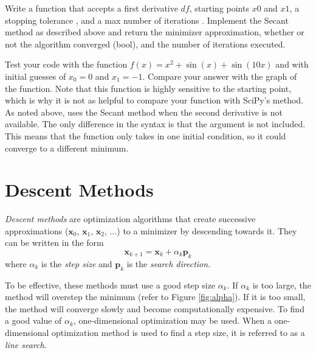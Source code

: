 \begin{problem}
Write a function that accepts a first derivative $df$, starting points $x0$ and $x1$, a stopping tolerance , and a max number of iterations .
Implement the Secant method as described above and return the minimizer approximation, whether or not the algorithm converged (bool), and the number of iterations executed.

Test your code with the function $f(x) = x^2 + \sin(x) + \sin(10x)$ and with initial guesses of $x_0 = 0$ and $x_1 = -1$.
Compare your answer with the graph of the function.
Note that this function is highly sensitive to the starting point, which is why it is not as helpful to compare your function with SciPy's method.
As noted above,  uses the Secant method when the second derivative is not available.
The only difference in the syntax is that the  argument is not included.
This means that the function only takes in one initial condition, so it could converge to a different minimum.
\end{problem}

\section*{Descent Methods} %

\emph{Descent methods} are optimization algorithms that create successive approximations ($\textbf{x}_0$, $\textbf{x}_1$,  $\textbf{x}_2$, ...) to a minimizer by descending towards it.
They can be written in the form
\begin{equation}
\textbf{x}_{k+1} = \textbf{x}_k + \alpha_k \textbf{p}_k
\label{eq:descent}
\end{equation}
where $\alpha_k$ is the \emph{step size} and $\textbf{p}_k$ is the \emph{search direction}.

To be effective, these methods must use a good step size $\alpha_k$.
If $\alpha_k$  is too large, the method will overstep the minimum (refer to Figure \ref{fig:alpha}).
If it is too small, the method will converge slowly and become computationally expensive.
To find a good value of $\alpha_k$, one-dimensional optimization may be used.
When a one-dimensional optimization method is used to find a step size, it is referred to as a \emph{line search}.

